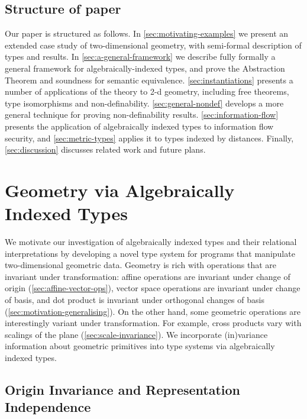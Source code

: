\documentclass{sigplanconf}
\theoremstyle{examplestyle}
\theoremstyle{restatementstyle}
\begin{document}
\subsection{Structure of paper}
Our paper is structured as follows. In \autoref{sec:motivating-examples}
we present an extended case study of two-dimensional geometry, with semi-formal
description of types and results.
In \autoref{sec:a-general-framework} we describe fully formally a general framework
for algebraically-indexed types, and prove the Abstraction Theorem and
soundness for semantic equivalence. \autoref{sec:instantiations} presents a number
of applications of the theory to 2-d geometry, including free theorems, type isomorphisms
and non-definability. \autoref{sec:general-nondef} develops a more general technique 
for proving non-definability results. \autoref{sec:information-flow} presents
the application of algebraically indexed types to information flow security, and
\autoref{sec:metric-types} applies it to types indexed by distances.
Finally, \autoref{sec:discussion} discusses related work and future plans.


\section{Geometry via Algebraically Indexed Types}
\label{sec:motivating-examples}

We motivate our investigation of algebraically indexed types and their
relational interpretations by developing a novel type system for
programs that manipulate two-dimensional geometric data. Geometry is
rich with operations that are invariant under transformation: affine
operations are invariant under change of origin
(\autoref{sec:affine-vector-ops}), vector space operations are
invariant under change of basis, and dot product is invariant under
orthogonal changes of basis
(\autoref{sec:motivation-generalising}). On the other hand, some
geometric operations are interestingly variant under transformation.
For example, cross products vary with scalings of the plane
(\autoref{sec:scale-invariance}). We incorporate (in)variance
information about geometric primitives into type systems via
algebraically indexed types.

\subsection{Origin Invariance and Representation Independence}\label{sec:oiri}
\end{document}
